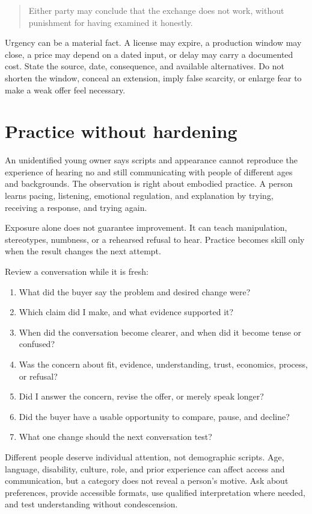 \begin{quote}
Either party may conclude that the exchange does not work, without punishment
for having examined it honestly.
\end{quote}

Urgency can be a material fact. A license may expire, a production window may
close, a price may depend on a dated input, or delay may carry a documented
cost. State the source, date, consequence, and available alternatives. Do not
shorten the window, conceal an extension, imply false scarcity, or enlarge fear
to make a weak offer feel necessary.

\section{Practice without hardening}

An unidentified young owner says scripts and appearance cannot reproduce the
experience of hearing no and still communicating with people of different
ages and backgrounds. The observation is right about embodied practice. A
person learns pacing, listening, emotional regulation, and explanation by
trying, receiving a response, and trying again.

Exposure alone does not guarantee improvement. It can teach manipulation,
stereotypes, numbness, or a rehearsed refusal to hear. Practice becomes skill
only when the result changes the next attempt.

Review a conversation while it is fresh:

\begin{enumerate}[itemsep=0.12em]
\item What did the buyer say the problem and desired change were?
\item Which claim did I make, and what evidence supported it?
\item When did the conversation become clearer, and when did it become tense or
  confused?
\item Was the concern about fit, evidence, understanding, trust, economics,
  process, or refusal?
\item Did I answer the concern, revise the offer, or merely speak longer?
\item Did the buyer have a usable opportunity to compare, pause, and decline?
\item What one change should the next conversation test?
\end{enumerate}

Different people deserve individual attention, not demographic scripts. Age,
language, disability, culture, role, and prior experience can affect access and
communication, but a category does not reveal a person's motive. Ask about
preferences, provide accessible formats, use qualified interpretation where
needed, and test understanding without condescension.

